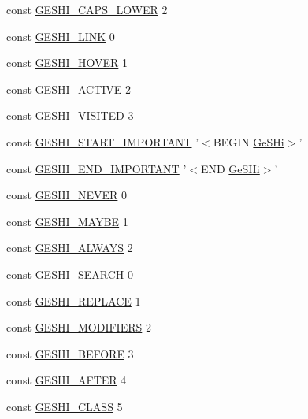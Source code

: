 \begin{DoxyCompactItemize}
\item 
const \hyperlink{geshi_8php_ae577346259dbdde6a7a0496bb5506a1f}{G\-E\-S\-H\-I\-\_\-\-C\-A\-P\-S\-\_\-\-L\-O\-W\-E\-R} 2
\item 
const \hyperlink{geshi_8php_a331e5dc0cf2a33efd061f37c52a8f1b1}{G\-E\-S\-H\-I\-\_\-\-L\-I\-N\-K} 0
\item 
const \hyperlink{geshi_8php_a0ef9109598d2979e6e86b9745b6df378}{G\-E\-S\-H\-I\-\_\-\-H\-O\-V\-E\-R} 1
\item 
const \hyperlink{geshi_8php_a4d7a4c7dd9b37d0ad87e7f608aceb730}{G\-E\-S\-H\-I\-\_\-\-A\-C\-T\-I\-V\-E} 2
\item 
const \hyperlink{geshi_8php_a1e565db022fc06a7a9dac10bc247a309}{G\-E\-S\-H\-I\-\_\-\-V\-I\-S\-I\-T\-E\-D} 3
\item 
const \hyperlink{geshi_8php_ae681952f8490031cff157153f965cbaf}{G\-E\-S\-H\-I\-\_\-\-S\-T\-A\-R\-T\-\_\-\-I\-M\-P\-O\-R\-T\-A\-N\-T} '$<$B\-E\-G\-I\-N \hyperlink{class_ge_s_hi}{Ge\-S\-Hi}$>$'
\item 
const \hyperlink{geshi_8php_af04ae98a020cfe3d18ff0fdae552b240}{G\-E\-S\-H\-I\-\_\-\-E\-N\-D\-\_\-\-I\-M\-P\-O\-R\-T\-A\-N\-T} '$<$E\-N\-D \hyperlink{class_ge_s_hi}{Ge\-S\-Hi}$>$'
\item 
const \hyperlink{geshi_8php_ae8d10560a1521054157078b7c900bac5}{G\-E\-S\-H\-I\-\_\-\-N\-E\-V\-E\-R} 0
\item 
const \hyperlink{geshi_8php_a080daa0b765d40f4278400ec7ee5516f}{G\-E\-S\-H\-I\-\_\-\-M\-A\-Y\-B\-E} 1
\item 
const \hyperlink{geshi_8php_ac99f8d1c5e483d980b3a5898e63c5ece}{G\-E\-S\-H\-I\-\_\-\-A\-L\-W\-A\-Y\-S} 2
\item 
const \hyperlink{geshi_8php_a600cf0cefcaff88611c607804fa92d9b}{G\-E\-S\-H\-I\-\_\-\-S\-E\-A\-R\-C\-H} 0
\item 
const \hyperlink{geshi_8php_accd34e52b0bbc2beff3cf62e33d24f6c}{G\-E\-S\-H\-I\-\_\-\-R\-E\-P\-L\-A\-C\-E} 1
\item 
const \hyperlink{geshi_8php_af36b35daee7f0a188ebd83f81d93d7cb}{G\-E\-S\-H\-I\-\_\-\-M\-O\-D\-I\-F\-I\-E\-R\-S} 2
\item 
const \hyperlink{geshi_8php_a4dcf8c272993a68180bc10566741f88b}{G\-E\-S\-H\-I\-\_\-\-B\-E\-F\-O\-R\-E} 3
\item 
const \hyperlink{geshi_8php_a9af1ed4c363ea643560ad9151f54d569}{G\-E\-S\-H\-I\-\_\-\-A\-F\-T\-E\-R} 4
\item 
const \hyperlink{geshi_8php_a7b8964b344b8b529501174b021e3141c}{G\-E\-S\-H\-I\-\_\-\-C\-L\-A\-S\-S} 5
\item 

\end{DoxyCompactItemize}
